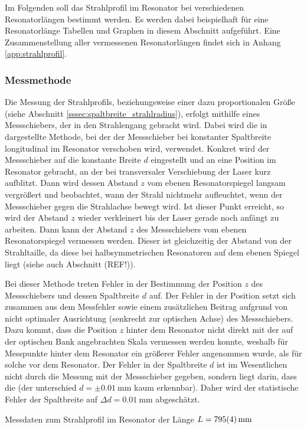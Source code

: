 \documentclass[11pt, a4paper]{article}
\numberwithin{equation}{section}
\begin{document}
Im Folgenden soll das Strahlprofil im Resonator bei verschiedenen Resonatorlängen bestimmt werden.
Es werden dabei beispielhaft für eine Resonatorlänge Tabellen und Graphen in diesem Abschnitt aufgeführt.
Eine Zusammenstellung aller vermessenen Resonatorlängen findet sich in Anhang \ref{app:strahlprofil}.

\subsubsection{Messmethode}
Die Messung der Strahlprofils, beziehungsweise einer dazu proportionalen Größe (siehe Abschnitt \ref{sssec:spaltbreite_strahlradius}), erfolgt mithilfe eines Messschiebers, der in den Strahlengang gebracht wird.
Dabei wird die in \cite{anleitung} dargestellte Methode, bei der der Messschieber bei konstanter Spaltbreite longitudinal im Resonator verschoben wird, verwendet.
Konkret wird der Messschieber auf die konstante Breite $d$ eingestellt und an eine Position im Resonator gebracht, an der bei transversaler Verschiebung der Laser kurz aufblitzt.
Dann wird dessen Abstand $z$ vom ebenen Resonatorspiegel langsam vergrößert und beobachtet, wann der Strahl nichtmehr aufleuchtet, wenn der Messschieber gegen die Strahlachse bewegt wird.
Ist dieser Punkt erreicht, so wird der Abstand $z$ wieder verkleinert bis der Laser gerade noch anfängt zu arbeiten.
Dann kann der Abstand $z$ des Messschiebers vom ebenen Resonatorspiegel vermessen werden.
Dieser ist gleichzeitig der Abstand von der Strahltaille, da diese bei halbsymmetrischen Resonatoren auf dem ebenen Spiegel liegt (siehe auch Abschnitt (REF!)).

Bei dieser Methode treten Fehler in der Bestimmung der Position $z$ des Messschiebers und dessen Spaltbreite $d$ auf.
Der Fehler in der Position setzt sich zusammen aus dem Messfehler sowie einem zusätzlichen Beitrag aufgrund von nicht optimaler Ausrichtung (senkrecht zur optischen Achse) des Messschiebers.
Dazu kommt, dass die Position $z$ hinter dem Resonator nicht direkt mit der auf der optischen Bank angebrachten Skala vermessen werden konnte, weshalb für Messpunkte hinter dem Resonator ein größerer Fehler angenommen wurde, als für solche vor dem Resonator.
Der Fehler in der Spaltbreite $d$ ist im Wesentlichen nicht durch die Messung mit der Messschieber gegeben, sondern liegt darin, dass die (der unterschied $d = \pm \SI{0.01}{\milli\metre}$ kaum erkennbar).
Daher wird der statistische Fehler der Spaltbreite auf $\Delta d = \SI{0.01}{\milli\metre}$ abgeschätzt.
\begin{table}[h]
	\centering
	
	\caption{Messdaten zum Strahlprofil im Resonator der Länge $L = \SI{795 +- 4}{\milli\metre}$}
	\label{tab:ex_messdaten_strahlprofil}
\end{table}
\end{document}
